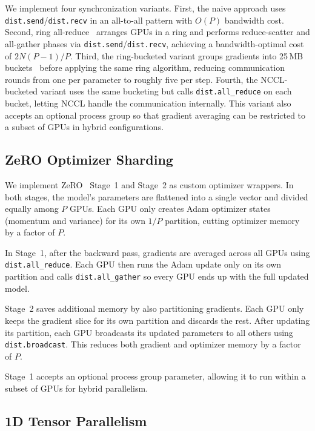 \documentclass[conference]{IEEEtran}
\begin{document}
We implement four synchronization variants. First, the naive approach uses \texttt{dist.send}/\texttt{dist.recv} in an all-to-all pattern with $O(P)$ bandwidth cost. Second, ring all-reduce~\cite{patarasuk2009bandwidth} arranges GPUs in a ring and performs reduce-scatter and all-gather phases via \texttt{dist.send}/\texttt{dist.recv}, achieving a bandwidth-optimal cost of $2N(P{-}1)/P$. Third, the ring-bucketed variant groups gradients into 25\,MB buckets~\cite{li2020pytorch} before applying the same ring algorithm, reducing communication rounds from one per parameter to roughly five per step. Fourth, the NCCL-bucketed variant uses the same bucketing but calls \texttt{dist.all\_reduce} on each bucket, letting NCCL handle the communication internally. This variant also accepts an optional process group so that gradient averaging can be restricted to a subset of GPUs in hybrid configurations.

\subsection{ZeRO Optimizer Sharding}

We implement ZeRO~\cite{rajbhandari2019zero} Stage~1 and Stage~2 as custom optimizer wrappers. In both stages, the model's parameters are flattened into a single vector and divided equally among $P$ GPUs. Each GPU only creates Adam optimizer states (momentum and variance) for its own $1/P$ partition, cutting optimizer memory by a factor of $P$.

In Stage~1, after the backward pass, gradients are averaged across all GPUs using \texttt{dist.all\_reduce}. Each GPU then runs the Adam update only on its own partition and calls \texttt{dist.all\_gather} so every GPU ends up with the full updated model.

Stage~2 saves additional memory by also partitioning gradients. Each GPU only keeps the gradient slice for its own partition and discards the rest. After updating its partition, each GPU broadcasts its updated parameters to all others using \texttt{dist.broadcast}. This reduces both gradient and optimizer memory by a factor of $P$.

Stage~1 accepts an optional process group parameter, allowing it to run within a subset of GPUs for hybrid parallelism.

\subsection{1D Tensor Parallelism}
\end{document}
